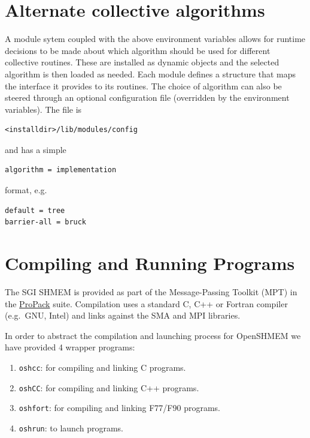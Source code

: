 \documentclass[english]{article}
\begin{document}
\section{Alternate collective algorithms}

A module sytem coupled with the above environment variables allows for
runtime decisions to be made about which algorithm should be used for
different collective routines. These are installed as dynamic objects
and the selected algorithm is then loaded as needed. Each module
defines a structure that maps the interface it provides to its
routines. The choice of algorithm can also be steered through an
optional configuration file (overridden by the environment variables).
The file is

\begin{lstlisting}
<installdir>/lib/modules/config
\end{lstlisting}

and has a simple

\begin{lstlisting}
algorithm = implementation
\end{lstlisting}

format, e.g.\

\begin{lstlisting}
default = tree
barrier-all = bruck
\end{lstlisting}

\section{Compiling and Running Programs}

The SGI SHMEM is provided as part of the Message-Passing Toolkit (MPT)
in the
\href{http://www.sgi.com/products/software/propack.html}{ProPack}
suite. Compilation uses a standard C, C++ or Fortran compiler
(e.g.\  GNU, Intel) and links against the SMA and MPI libraries.

In order to abstract the compilation and launching process for
OpenSHMEM we have provided 4 wrapper programs:

\begin{enumerate}
\item \texttt{oshcc}: for compiling and linking C programs.
\item \texttt{oshCC}: for compiling and linking C++ programs.
\item \texttt{oshfort}: for compiling and linking F77/F90 programs.
\item \texttt{oshrun}: to launch programs.
\end{enumerate}
\end{document}
